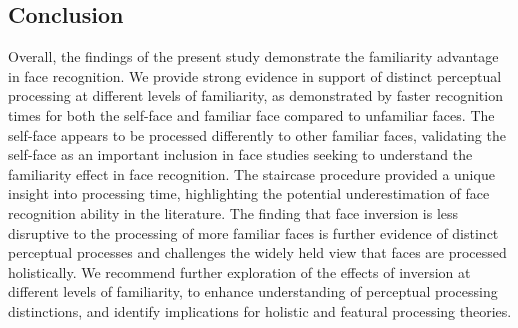 \documentclass[
  10pt,
  letterpaper,
]{article}
\begin{document}
\subsection{Conclusion}\label{conclusion}

Overall, the findings of the present study demonstrate the familiarity
advantage in face recognition. We provide strong evidence in support of
distinct perceptual processing at different levels of familiarity, as
demonstrated by faster recognition times for both the self-face and
familiar face compared to unfamiliar faces. The self-face appears to be
processed differently to other familiar faces, validating the self-face
as an important inclusion in face studies seeking to understand the
familiarity effect in face recognition. The staircase procedure provided
a unique insight into processing time, highlighting the potential
underestimation of face recognition ability in the literature. The
finding that face inversion is less disruptive to the processing of more
familiar faces is further evidence of distinct perceptual processes and
challenges the widely held view that faces are processed holistically.
We recommend further exploration of the effects of inversion at
different levels of familiarity, to enhance understanding of perceptual
processing distinctions, and identify implications for holistic and
featural processing theories.


\nolinenumbers
  
\end{document}
